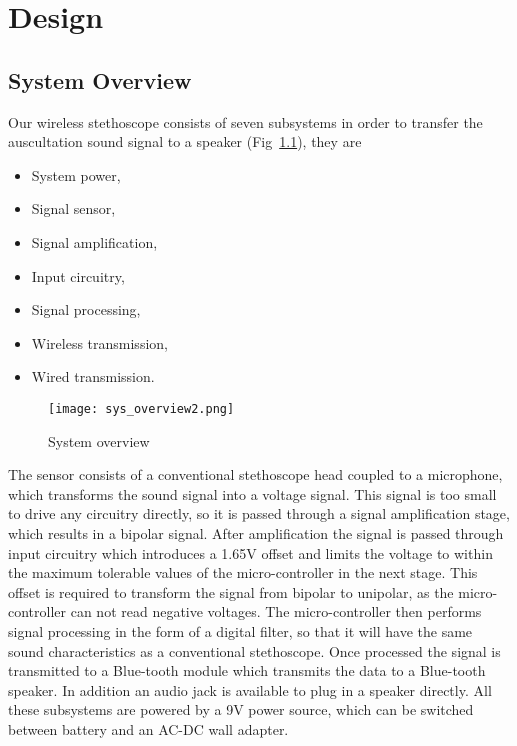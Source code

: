 \chapter{Design} \label{design}

\section{System Overview}
Our wireless stethoscope consists of seven subsystems in order to transfer the auscultation sound signal to a speaker (Fig~\ref{fig:sys_overview}), they are
\begin{itemize}
	\item System power,
	\item Signal sensor,
	\item Signal amplification,
	\item Input circuitry,
	\item Signal processing,
	\item Wireless transmission,
	\item Wired transmission.
\end{itemize}

\begin{figure}[!ht]
	\centering
	
		\texttt{[image: sys\_overview2.png]}
	
	\caption{System overview}
	\label{fig:sys_overview}
\end{figure}

The sensor consists of a conventional stethoscope head coupled to a microphone, which transforms the sound signal into a voltage signal. This signal is too small to drive any circuitry directly, so it is passed through a signal amplification stage, which results in a bipolar signal. After amplification the signal is passed through input circuitry which introduces a 1.65V offset and limits the voltage to within the maximum tolerable values of the micro-controller in the next stage. This offset is required to transform the signal from bipolar to unipolar, as the micro-controller can not read negative voltages. The micro-controller then performs signal processing in the form of a digital filter, so that it will have the same sound characteristics as a conventional stethoscope. Once processed the signal is transmitted to a Blue-tooth module which transmits the data to a Blue-tooth speaker. In addition an audio jack is available to plug in a speaker directly. All these subsystems are powered by a 9V power source, which can be switched between battery and an AC-DC wall adapter.


